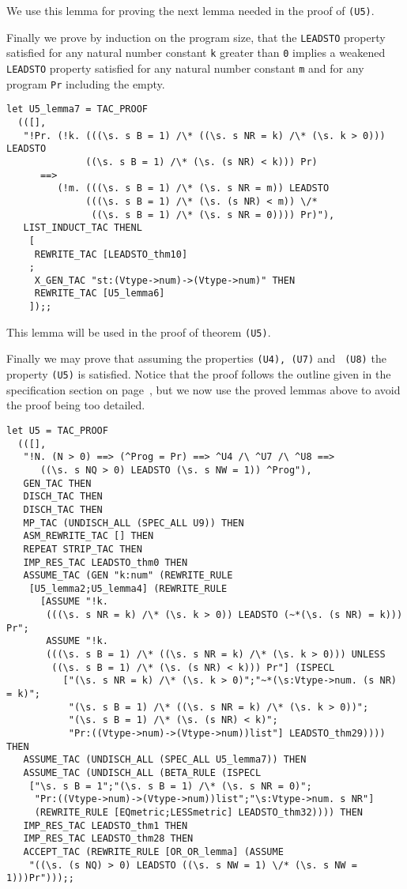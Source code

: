 We use this lemma for proving the next lemma needed in the proof of {\tt (U5)}.

Finally we prove by induction on the program size, that the {\tt LEADSTO} 
property satisfied for any natural number constant {\tt k} greater than 
{\tt 0} implies a weakened {\tt LEADSTO} property satisfied for any natural 
number constant {\tt m} and for any program {\tt Pr} including the empty.
{\footnotesize
\begin{verbatim}
let U5_lemma7 = TAC_PROOF
  (([],
   "!Pr. (!k. (((\s. s B = 1) /\* ((\s. s NR = k) /\* (\s. k > 0))) LEADSTO
              ((\s. s B = 1) /\* (\s. (s NR) < k))) Pr)
      ==>
         (!m. (((\s. s B = 1) /\* (\s. s NR = m)) LEADSTO
              (((\s. s B = 1) /\* (\s. (s NR) < m)) \/*
               ((\s. s B = 1) /\* (\s. s NR = 0)))) Pr)"),
   LIST_INDUCT_TAC THENL
    [
     REWRITE_TAC [LEADSTO_thm10]
    ;
     X_GEN_TAC "st:(Vtype->num)->(Vtype->num)" THEN
     REWRITE_TAC [U5_lemma6]
    ]);;
\end{verbatim}
}

This lemma will be used in the proof of theorem {\tt (U5)}.

Finally we may prove that assuming the properties {\tt (U4), (U7)} and {\tt
(U8)} the property {\tt (U5)} is satisfied.  Notice that the proof follows the
outline given in the specification section on page~\pageref{U5page}, but we now
use the proved lemmas above to avoid the proof being too detailed.

{\footnotesize
\begin{verbatim}
let U5 = TAC_PROOF
  (([],
   "!N. (N > 0) ==> (^Prog = Pr) ==> ^U4 /\ ^U7 /\ ^U8 ==>
      ((\s. s NQ > 0) LEADSTO (\s. s NW = 1)) ^Prog"),
   GEN_TAC THEN
   DISCH_TAC THEN
   DISCH_TAC THEN
   MP_TAC (UNDISCH_ALL (SPEC_ALL U9)) THEN
   ASM_REWRITE_TAC [] THEN
   REPEAT STRIP_TAC THEN
   IMP_RES_TAC LEADSTO_thm0 THEN
   ASSUME_TAC (GEN "k:num" (REWRITE_RULE
    [U5_lemma2;U5_lemma4] (REWRITE_RULE
      [ASSUME "!k.
       (((\s. s NR = k) /\* (\s. k > 0)) LEADSTO (~*(\s. (s NR) = k))) Pr";
       ASSUME "!k.
       (((\s. s B = 1) /\* ((\s. s NR = k) /\* (\s. k > 0))) UNLESS
        ((\s. s B = 1) /\* (\s. (s NR) < k))) Pr"] (ISPECL
          ["(\s. s NR = k) /\* (\s. k > 0)";"~*(\s:Vtype->num. (s NR) = k)";
           "(\s. s B = 1) /\* ((\s. s NR = k) /\* (\s. k > 0))";
           "(\s. s B = 1) /\* (\s. (s NR) < k)";
           "Pr:((Vtype->num)->(Vtype->num))list"] LEADSTO_thm29)))) THEN
   ASSUME_TAC (UNDISCH_ALL (SPEC_ALL U5_lemma7)) THEN
   ASSUME_TAC (UNDISCH_ALL (BETA_RULE (ISPECL
    ["\s. s B = 1";"(\s. s B = 1) /\* (\s. s NR = 0)";
     "Pr:((Vtype->num)->(Vtype->num))list";"\s:Vtype->num. s NR"]
     (REWRITE_RULE [EQmetric;LESSmetric] LEADSTO_thm32)))) THEN
   IMP_RES_TAC LEADSTO_thm1 THEN
   IMP_RES_TAC LEADSTO_thm28 THEN
   ACCEPT_TAC (REWRITE_RULE [OR_OR_lemma] (ASSUME
    "((\s. (s NQ) > 0) LEADSTO ((\s. s NW = 1) \/* (\s. s NW = 1)))Pr")));;
\end{verbatim}
}

